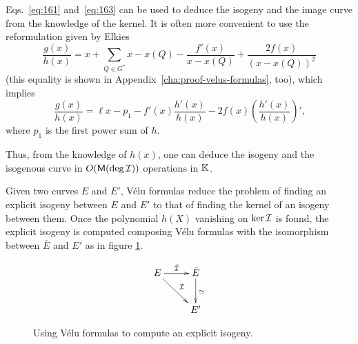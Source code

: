 \begin{remark}
  Eqs.~\eqref{eq:161} and~\eqref{eq:163} can be used to deduce the
  isogeny and the image curve from the knowledge of the kernel.
    It is often more convenient
  to use the reformulation given by Elkies~\cite{elkies98}
  \begin{equation}
    \label{eq:157}
    \frac{g(x)}{h(x)} = x + \sum_{Q\in G^\ast}x - x(Q) - \frac{f'(x)}{x-x(Q)} + \frac{2f(x)}{(x-x(Q))^2}
  \end{equation}
  (this equality is shown in Appendix~\ref{cha:proof-velus-formulas},
  too), which implies
  \begin{equation}
    \label{eq:165}
    \frac{g(x)}{h(x)} = \ell x - p_1 - f'(x)\frac{h'(x)}{h(x)} -
    2f(x)\left(\frac{h'(x)}{h(x)}\right)'
    \text{,}
  \end{equation}
  where $p_1$ is the first power sum of $h$.  

  Thus, from the knowledge of $h(x)$, one can deduce the isogeny and
  the isogenous curve in $O(\mathsf{M}(\deg\mathcal{I}))$ operations in $\mathbb{K}$.
\end{remark}

Given two curves $E$ and $E'$, Vélu formulas reduce the problem of
finding an explicit isogeny between $E$ and $E'$ to that of finding
the kernel of an isogeny between them. Once the polynomial $h(X)$
vanishing on $\ker\mathcal{I}$ is found, the explicit isogeny is computed
composing Vélu formulas with the isomorphism between $\bar{E}$ and
$E'$ as in figure \ref{fig:velu}.

\begin{figure}
  \centering
  \[\xymatrix{
    E \ar[r]^{\bar{\I}} \ar[rd]^\I & \bar{E} \ar[d]^{\simeq}\\
    & E'
  }\]
  \caption{Using Vélu formulas to compute an explicit isogeny.}
  \label{fig:velu}
\end{figure}




%
